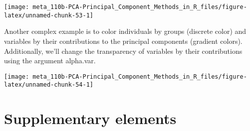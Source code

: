 \documentclass[]{book}
\newenvironment{Shaded}{\begin{snugshade}}{\end{snugshade}}
\newcommand{\CommentTok}[1]{\textcolor[rgb]{0.56,0.35,0.01}{\textit{#1}}}
\newcommand{\DataTypeTok}[1]{\textcolor[rgb]{0.13,0.29,0.53}{#1}}
\newcommand{\DecValTok}[1]{\textcolor[rgb]{0.00,0.00,0.81}{#1}}
\newcommand{\KeywordTok}[1]{\textcolor[rgb]{0.13,0.29,0.53}{\textbf{#1}}}
\newcommand{\NormalTok}[1]{#1}
\newcommand{\OperatorTok}[1]{\textcolor[rgb]{0.81,0.36,0.00}{\textbf{#1}}}
\newcommand{\OtherTok}[1]{\textcolor[rgb]{0.56,0.35,0.01}{#1}}
\newcommand{\StringTok}[1]{\textcolor[rgb]{0.31,0.60,0.02}{#1}}
\begin{document}
\begin{center}\texttt{[image: meta\_110b-PCA-Principal\_Component\_Methods\_in\_R\_files/figure-latex/unnamed-chunk-53-1]} \end{center}

Another complex example is to color individuals by groups (discrete color) and variables by their contributions to the principal components (gradient colors). Additionally, we'll change the transparency of variables by their contributions using the argument alpha.var.

\begin{Shaded}
\end{Shaded}

\begin{center}\texttt{[image: meta\_110b-PCA-Principal\_Component\_Methods\_in\_R\_files/figure-latex/unnamed-chunk-54-1]} \end{center}

\hypertarget{supplementary-elements}{%
\section{Supplementary elements}\label{supplementary-elements}}
\end{document}
